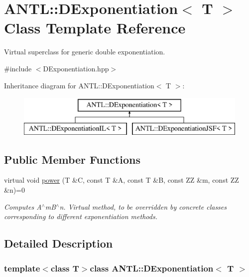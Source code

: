 \hypertarget{classANTL_1_1DExponentiation}{\section{A\-N\-T\-L\-:\-:D\-Exponentiation$<$ T $>$ Class Template Reference}
\label{classANTL_1_1DExponentiation}
}


Virtual superclass for generic double exponentiation.  




{\ttfamily \#include $<$D\-Exponentiation.\-hpp$>$}

Inheritance diagram for A\-N\-T\-L\-:\-:D\-Exponentiation$<$ T $>$\-:\begin{figure}[H]
\begin{center}
\leavevmode
\includegraphics[height=2.000000cm]{d0/df7/classANTL_1_1DExponentiation}
\end{center}
\end{figure}
\subsection*{Public Member Functions}
\begin{DoxyCompactItemize}
\item 
virtual void \hyperlink{classANTL_1_1DExponentiation_a3c8c562a37b0d5d849ab1cfb3adfc73f}{power} (T \&C, const T \&A, const T \&B, const Z\-Z \&m, const Z\-Z \&n)=0
\begin{DoxyCompactList}\small\item\em Computes A$^\wedge$m\-B$^\wedge$n. Virtual method, to be overridden by concrete classes corresponding to different exponentiation methods. \end{DoxyCompactList}\end{DoxyCompactItemize}


\subsection{Detailed Description}
\subsubsection*{template$<$class T$>$class A\-N\-T\-L\-::\-D\-Exponentiation$<$ T $>$}

